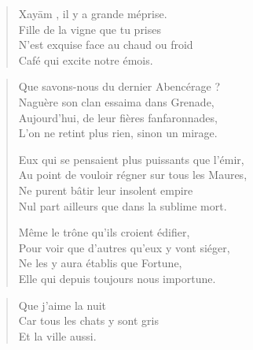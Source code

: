 %
\begin{verse}\quatrain
  Xayām%
  \label{foot.xayam}, il y a grande méprise.\\  %
  Fille de la vigne que tu prises\\ 
  N’est exquise face au chaud ou froid\\ 
  Café qui excite notre émois.  %
\end{verse}

\begin{verse}\quatrain
  Que savons-nous du dernier Abencérage%
  \label{foot.Abencerage} ?\\  %
  Naguère son clan essaima dans Grenade,\\ 
  Aujourd’hui, de leur fières fanfaronnades,\\ 
  L’on ne retint plus rien, sinon un mirage.  %

  Eux qui se pensaient plus puissants que l’émir,\\ 
  Au point de vouloir régner sur tous les Maures,\\ 
  Ne purent bâtir leur insolent empire\\ 
  Nul part ailleurs que dans la sublime mort.  %

  Même le trône qu’ils croient édifier,\\ 
  Pour voir que d’autres qu’eux y vont siéger,\\ 
  Ne les y aura établis que Fortune,\\ 
  Elle qui depuis toujours nous importune.  %
\end{verse}

\begin{verse}\haiku
  Que j’aime la nuit\\  %
  Car tous les chats y sont gris\\  %
  Et la ville aussi.
\end{verse}

